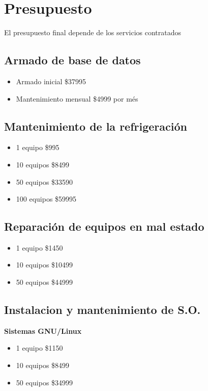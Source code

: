 \documentclass{article}
\begin{document}
\pagebreak

\section{Presupuesto}
	El presupuesto final depende de los servicios contratados

	\subsection{Armado de base de datos}
		\begin{itemize}
		\item Armado inicial \dotfill \$37995
		\item Mantenimiento mensual \dotfill \$4999 por més
		\end{itemize}
	
	\subsection{Mantenimiento de la refrigeración}
		\begin{itemize}
		\item 1 equipo \dotfill \$995
		\item 10 equipos \dotfill \$8499
		\item 50 equipos \dotfill \$33590
		\item 100 equipos \dotfill \$59995
		\end{itemize}
	
	\subsection{Reparación de equipos en mal estado}
		\begin{itemize}
		\item 1 equipo \dotfill \$1450
		\item 10 equipos \dotfill \$10499
		\item 50 equipos \dotfill \$44999
		\end{itemize}
	
	\subsection{Instalacion y mantenimiento de S.O.}
		\textbf{Sistemas GNU/Linux}
		\begin{itemize}
		\item 1 equipo \dotfill \$1150
		\item 10 equipos \dotfill \$8499
		\item 50 equipos \dotfill \$34999
		\end{itemize}
		
\end{document}
